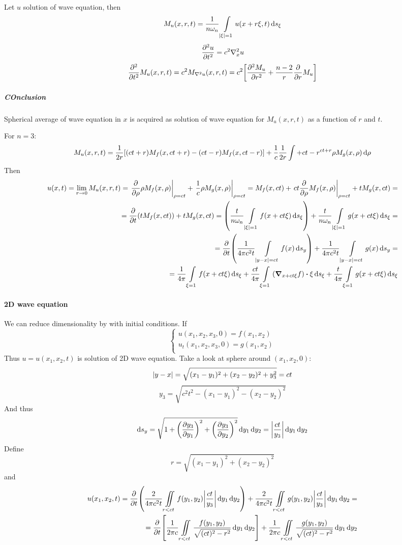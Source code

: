 Let $u$ solution of  wave equation, then
$$M_u(x,r,t) = \frac{1}{n\omega_n} \int\limits_{\abs{\xi} = 1} u(x+r\xi, t) \dd{s_\xi}$$
$$\pdv[2]{u}{t} = c^2 \laplacian_x{u}$$
$$\pdv[2]{t} M_u(x,r,t) = c^2 M_{\laplacian{u}}(x,r,t) = c^2\qty[\pdv[2]{M_u}{r} + \frac{n-2}{r}\pdv{r}M_u]$$

\subparagraph{COnclusion} Spherical average of wave equation in $x$ is acquired as solution of wave equation for $M_u(x,r,t)$ as a function of $r$ and $t$.

For $n=3$:
$$M_u(x,r,t) = \frac{1}{2r}\qty[(ct+r) M_f(x,ct+r) - (ct-r)M_f(x,ct-r)] + \frac{1}{c}\frac{1}{2r} \int+{ct-r}^{ct+r} \rho M_g(x,\rho) \dd{\rho}$$
Then
\begin{align*}
u(x,t) = \lim_{r\to 0} M_u(x,r,t) = \eval{\pdv{\rho} \rho M_f(x,\rho)}_{\rho=ct} + \eval{\frac{1}{c} \rho M_g(x,\rho)}_{\rho=ct}= M_f(x,ct) + \eval{ct \pdv{\rho} M_f(x,\rho)}_{\rho=ct} + tM_g(x,ct) =\\=
\pdv{t} \qty(t M_f(x,ct)) + tM_g(x,ct) = \qty(\frac{t}{n\omega_n} \int\limits_{\abs{\xi} = 1} f(x+ct\xi) \dd{s_\xi}) + \frac{t}{n\omega_n} \int\limits_{\abs{\xi} = 1} g(x+ct\xi) \dd{s_\xi} =\\= \pdv{t} \qty(\frac{1}{4\pi c^2 t} \int\limits_{\abs{y-x} =ct} f(x) \dd{s_y} ) + \frac{1}{4\pi c^2 t} \int\limits_{\abs{y-x} =ct} g(x) \dd{s_y} =\\= \frac{1}{4\pi} \int\limits_{\xi=1} f(x+ct\xi) \dd{s_\xi} + \frac{ct}{4\pi}  \int\limits_{\xi=1} \qty(\grad_{x+ct\xi}f)\vdot \xi \dd{s_\xi}+ \frac{t}{4\pi}  \int\limits_{\xi=1}  g(x+ct\xi) \dd{s_\xi}
\end{align*}


\paragraph{2D wave equation}
We can reduce dimensionality by with initial conditions. If
$$\begin{cases}
u(x_1,x_2,x_3,0)= f(x_1,x_2)\\
u_t(x_1,x_2,x_3,0)= g(x_1,x_2)\\
\end{cases}$$
Thus $u=u(x_1,x_2,t)$ is solution of 2D wave equation. Take a look at sphere around $(x_1,x_2,0)$:
$$\abs{y-x}= \sqrt{(x_1-y_1)^2+(x_2-y_2)^2 +y_3^2} = ct$$
$$y_3 = \sqrt{c^2t^2 - (x_1-y_1)^2-(x_2-y_2)^2}$$
And thus
$$\dd{s_y} = \sqrt{1+\qty(\pdv{y_3}{y_1})^2 +\qty(\pdv{y_3}{y_2})^2}\dd{y_1}\dd{y_2} = \abs{ \frac{ct}{y_3}} \dd{y_1}\dd{y_2}$$
Define
$$r = \sqrt{(x_1-y_1)^2+(x_2-y_2)^2}$$
and
\begin{align*}
u(x_1,x_2,t) = \pdv{t} \qty(\frac{2}{4\pi c^2 t } \iint\limits_{r<ct} f(y_1,y_2) \abs{ \frac{ct}{y_3}}\dd{y_1}\dd{y_2}) + \frac{2}{4\pi c^2 t } \iint\limits_{r<ct} g(y_1,y_2) \abs{ \frac{ct}{y_3}}\dd{y_1}\dd{y_2} =\\= \pdv{t} \qty[\frac{1}{2\pi c} \iint\limits_{r<ct} \frac{f(y_1,y_2)}{\sqrt{(ct)^2-r^2}} \dd{y_1}\dd{y_2}] + \frac{1}{2\pi c} \iint\limits_{r<ct} \frac{g(y_1,y_2)}{\sqrt{(ct)^2-r^2}} \dd{y_1}\dd{y_2}
\end{align*}
